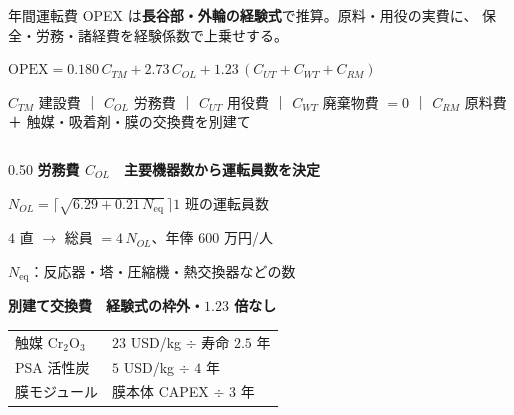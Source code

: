 \begin{frame}[t]

  \vspace*{1.2mm}
  {\footnotesize 年間運転費 OPEX は\textbf{長谷部・外輪の経験式}で推算。原料・用役の実費に、
   保全・労務・諸経費を経験係数で上乗せする。}\par

  \vspace{0.5em}
  {\small\boldmath$\mathrm{OPEX}=0.180\,C_{TM}+2.73\,C_{OL}+1.23\,(C_{UT}+C_{WT}+C_{RM})$\unboldmath}\par
  \vspace{0.2em}
  {\scriptsize $C_{TM}$ 建設費 ｜ $C_{OL}$ 労務費 ｜ $C_{UT}$ 用役費 ｜ $C_{WT}$ 廃棄物費 $=0$ ｜ $C_{RM}$ 原料費\\
   {\color{black!60}＋ 触媒・吸着剤・膜の交換費を別建て}}\par

  \vspace{0.7em}
  \begin{columns}[T,onlytextwidth]
    \begin{column}{0.50\textwidth}
      {\scriptsize\bfseries\color{HeaderBlue} 労務費 $C_{OL}$　主要機器数から運転員数を決定}\par
      \vspace{0.2em}
      {\scriptsize $N_{OL}=\big\lceil\sqrt{6.29+0.21\,N_{\mathrm{eq}}}\,\big\rceil$\quad $1$ 班の運転員数}\par
      \vspace{0.15em}
      {\scriptsize $4$ 直 $\to$ 総員 $=4\,N_{OL}$、年俸 $600$ 万円/人\par
       $N_{\mathrm{eq}}$：反応器・塔・圧縮機・熱交換器などの数}\par

      \vspace{0.7em}
      {\scriptsize\bfseries\color{HeaderBlue} 別建て交換費　経験式の枠外・$1.23$ 倍なし}\par
      \vspace{0.2em}
      {\scriptsize\setlength{\tabcolsep}{4pt}\renewcommand{\arraystretch}{1.2}%
       \begin{tabular}{@{}l l@{}}
         触媒 $\mathrm{Cr_2O_3}$ & $23$ USD/kg $\div$ 寿命 $2.5$ 年 \\
         PSA 活性炭 & $5$ USD/kg $\div$ $4$ 年 \\
         膜モジュール & 膜本体 CAPEX $\div$ $3$ 年 \\
       \end{tabular}}\par
    \end{column}


\end{columns}
\end{frame}
